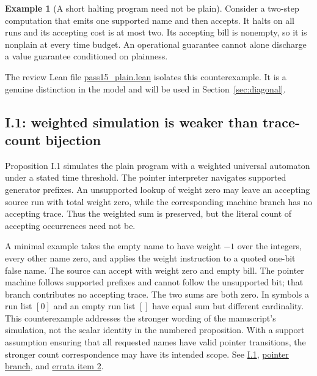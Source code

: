 \documentclass[11pt,letterpaper]{article}
\theoremstyle{definition}\newtheorem{definition}[theorem]{Definition}\newtheorem{example}[theorem]{Example}
\theoremstyle{remark}\newtheorem{remark}[theorem]{Remark}
\newcommand{\pub}[3]{\href{https://github.com/anthropics/formal-math/blob/11b6c7e3c927df2658f513b6b68ea7f8929c62c5/vp-vnp/#1\#L#2}{#3}}
\newcommand{\aud}[2]{\href{https://github.com/nousentllc/VP-VNP-Review/blob/567303d0bcf4f9d54390437b137752446e58ccd6/#1}{#2}}
\begin{document}
\begin{example}[A short halting program need not be plain]
Consider a two-step computation that emits one supported name and then accepts. It halts on all runs and its accepting cost is at most two. Its accepting bill is nonempty, so it is nonplain at every time budget. An operational guarantee cannot alone discharge a value guarantee conditioned on plainness.
\end{example}
The review Lean file \aud{checks/pass15_plain.lean}{pass15\_plain.lean} isolates this counterexample. It is a genuine distinction in the model and will be used in Section~\ref{sec:diagonal}.

\subsection{I.1: weighted simulation is weaker than trace-count bijection}\label{sec:i1}
Proposition I.1 simulates the plain program with a weighted universal automaton under a stated time threshold. The pointer interpreter navigates supported generator prefixes. An unsupported lookup of weight zero may leave an accepting source run with total weight zero, while the corresponding machine branch has no accepting trace. Thus the weighted sum is preserved, but the literal count of accepting occurrences need not be.

A minimal example takes the empty name to have weight $-1$ over the integers, every other name zero, and applies the weight instruction to a quoted one-bit false name. The source can accept with weight zero and empty bill. The pointer machine follows supported prefixes and cannot follow the unsupported bit; that branch contributes no accepting trace. The two sums are both zero. In symbols a run list $[0]$ and an empty run list $[]$ have equal sum but different cardinality. This counterexample addresses the stronger wording of the manuscript's simulation, not the scalar identity in the numbered proposition. With a support assumption ensuring that all requested names have valid pointer transitions, the stronger count correspondence may have its intended scope. See \pub{Paper/Universal.lean}{29}{I.1}, \pub{Nc/Uni/EvalU.lean}{251}{pointer branch}, and \aud{passes/publisher-errata.md}{errata item 2}.
\end{document}
